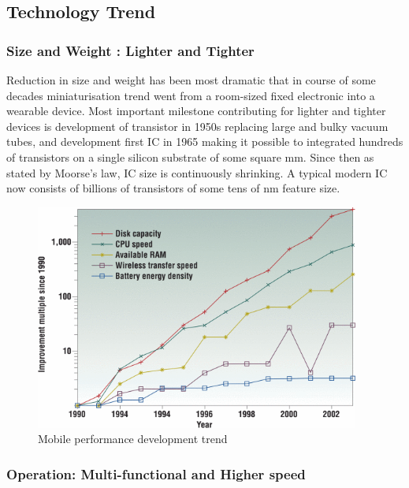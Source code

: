 \documentclass[UKenglish]{ifimaster}  %
\begin{document}
\subsection{Technology Trend}

\subsubsection{Size and Weight : Lighter and Tighter}


Reduction in size and weight has been most dramatic that in course of some decades miniaturisation trend went 
from a room-sized fixed electronic into a wearable device. Most important milestone contributing for lighter and 
tighter devices is development of transistor in 1950s replacing large and bulky vacuum tubes, and  
development first IC in 1965 making it possible to integrated hundreds of transistors on a single silicon substrate of 
some square mm. Since then as stated by Moorse's law, IC size is continuously shrinking. A typical modern IC now 
consists of billions of transistors of some  tens of nm feature size. \\

\begin{figure}[!htbp] %
   \centering
   \includegraphics[width=0.95\textwidth]{img/comp_tech_batt.png}
   \caption{Mobile performance development trend \cite{mobile_performance}}
   \label{fig:comp_tech_batt}
\end{figure}

\subsubsection{Operation: Multi-functional and Higher speed}
\end{document}
